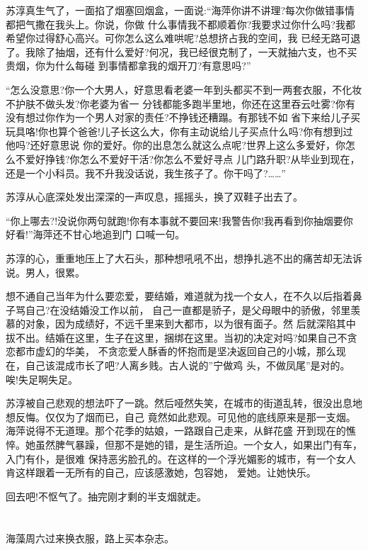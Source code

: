 \documentclass[11pt,a4paper,onecolumn]{article}
\begin{document}
苏淳真生气了，一面掐了烟塞回烟盒，一面说:``海萍你讲不讲理?每次你做错事情都把气撒在我头上。你说，你做
什么事情我不都顺着你?我要求过你什么吗?我都希望你过得舒心高兴。可你怎么这么难哄呢?总想挤占我的空间，我
已经无路可退了。我除了抽烟，还有什么爱好?何况，我已经很克制了，一天就抽六支，也不买贵烟，你为什么每碰
到事情都拿我的烟开刀?有意思吗?''

``怎么没意思?你一个大男人，好意思看老婆一年到头都买不到一两套衣服，不化妆不护肤不做头发?你老婆为省一
分钱都能多跑半里地，你还在这里吞云吐雾?你有没有想过你作为一个男人对家的责任?不挣钱还糟蹋。有那钱不如
省下来给儿子买玩具咯!你也算个爸爸!儿子长这么大，你有主动说给儿子买点什么吗?你有想到过他吗?还好意思说
你的爱好。你的出息怎么就这么点呢?世界上这么多爱好，你怎么不爱好挣钱?你怎么不爱好干活?你怎么不爱好寻点
儿门路升职?从毕业到现在，还是一个小科员。我不升我没话说，我生孩子了。你干吗了?……''

苏淳从心底深处发出深深的一声叹息，摇摇头，换了双鞋子出去了。

``你上哪去?!没说你两句就跑!你有本事就不要回来!我警告你!我再看到你抽烟要你好看!''海萍还不甘心地追到门
口喊一句。

苏淳的心，重重地压上了大石头，那种想吼吼不出，想挣扎逃不出的痛苦却无法诉说。男人，很累。

想不通自己当年为什么要恋爱，要结婚，难道就为找一个女人，在不久以后指着鼻子骂自己?在没结婚没工作以前，
自己一直都是骄子，是父母眼中的骄傲，邻里羡慕的对象，因为成绩好，不远千里来到大都市，以为很有面子。然
后就深陷其中拔不出。结婚在这里，生子在这里，捆绑在这里。当初的决定对吗?如果自己不贪恋都市虚幻的华美，
不贪恋爱人酥香的怀抱而是坚决返回自己的小城，那么现在，自己该混成市长了吧?人离乡贱。古人说的''宁做鸡
头，不做凤尾''是对的。唉!失足啊失足。

苏淳被自己悲观的想法吓了一跳。然后哑然失笑，在城市的街道乱转，很没出息地想反悔。仅仅为了烟而已，自己
竟然如此悲观。可见他的底线原来是那一支烟。海萍说得不无道理。那个花季的姑娘，一路跟自己走来，从鲜花盛
开到现在的憔悴。她虽然脾气暴躁，但那不是她的错，是生活所迫。一个女人，如果出门有车，入门有仆，是很难
保持恶劣脸孔的。在这样的一个浮光媚影的城市，有一个女人肯这样跟着一无所有的自己，应该感激她，包容她，
爱她。让她快乐。

回去吧!不怄气了。抽完刚才剩的半支烟就走。

\section[\thesection]{}

海藻周六过来换衣服，路上买本杂志。
\end{document}
